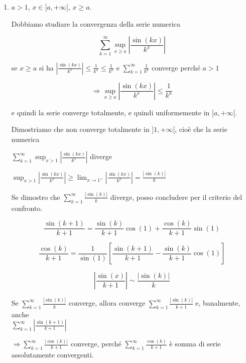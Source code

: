 \begin{exbar}
\begin{example}
\begin{enumerate}
		Se $x = 2j \pi$ allora $f_k(x)=f_k(2j\pi)=0 = \frac{\sin(2jk\pi)}{k^{2j\pi}} \,\, \forall k$ $\Rightarrow \sum_{k=1}^{\infty} f_k(2j\pi)=0$ $\Rightarrow$ la serie converge puntualmente $\forall x \geq 0$.
		
		\item $a > 1$, $x \in [a,+\infty[$, $x\geq a $.
		
		Dobbiamo studiare la convergenza della serie numerica 
		
		$$\sum_{k=1}^{\infty}\sup_{x \geq a} \left| \frac{\sin(kx)}{k^x} \right|$$
		
		se $x \geq a$ si ha $\left| \frac{\sin(kx)}{k^x} \right| \leq \frac{1}{k^x}\leq \frac{1}{k^a}$ e $\sum_{k=1}^{\infty}\frac{1}{k^a}$ converge perché $a > 1$
		
		$$\Rightarrow \sup_{x \geq a} \left|\frac{\sin(kx)}{k^x} \right| \leq \frac{1}{k^a}$$ 
		
		e quindi la serie converge totalmente, e quindi uniformemente in $[a,+\infty[$.
		
		Dimostriamo che non converge totalmente in $]1,+\infty[$, cioè che la serie numerica 
		
		\begin{center} 
			$\sum_{k=1}^{\infty}\sup_{x >1}|\frac{\sin(kx)}{k^x}|$ diverge
			
			$\sup_{x >1}|\frac{\sin(kx)}{k^x}|\geq \lim_{x \rightarrow 1^+}|\frac{\sin(kx)}{k^x}|=\frac{|\sin (k)|}{k}$
		\end{center}
		
		Se dimostro che $\sum_{k=1}^{\infty}\frac{|\sin(k)|}{k}$ diverge, posso concludere per il criterio del confronto.
		
		$$\frac{\sin(k+1)}{k+1}=\frac{\sin (k)}{k+1}\cos (1) +\frac{\cos(k)}{k+1}\sin(1)$$
		
		$$\frac{\cos(k)}{k+1}=\frac{1}{\sin(1)}\left[\frac{\sin(k+1)}{k+1} -\frac{\sin(k)}{k+1} \cos(1) \right]$$
		
		$$|\frac{\sin(x)}{k+1}| \sim \frac{|\sin(k)|}{k}$$
		
		Se $\sum_{k=1}^{\infty} \frac{|\sin(k)|}{k}$ converge,  allora converge $\sum_{k=1}^{\infty} \frac{|\sin(k)|}{k+1}$ e, banalmente, anche \\%
		$\sum_{k=1}^{\infty} \left|\frac{\sin(k+1)}{k+1} \right|$
		
		$\Rightarrow \sum_{k=1}^{\infty} \frac{|\cos(k)|}{k+1}$ converge, perché $\sum_{k=1}^{\infty} \frac{\cos(k)}{k+1}$ è somma di serie assolutamente convergenti.
		

\end{enumerate}
\end{example}
\end{exbar}
